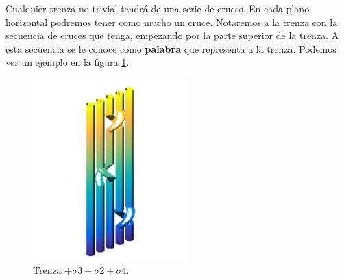 Cualquier trenza no trivial tendrá de una serie de cruces. En cada plano horizontal podremos tener como mucho un cruce. Notaremos a la trenza con la secuencia de cruces que tenga, empezando por la parte superior de la trenza. A esta secuencia se le conoce como \textbf{palabra} que representa a la trenza. Podemos ver un ejemplo en la figura \ref{tren5}.\\
\begin{figure}[h!]
	\centering
	\includegraphics[width=6cm]{itrenzas/t7.png}
	\caption{Trenza $+\sigma3-\sigma2+\sigma4$.}
	\label{tren5} 
\end{figure}


